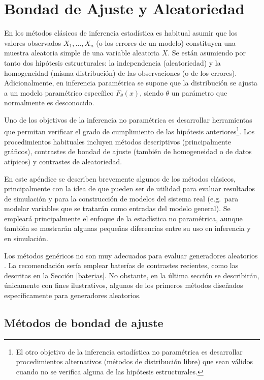 \documentclass[
  10pt,
]{book}
\theoremstyle{break}
\theoremstyle{nonumberplain}
\let\oldfootnote\footnote
\renewcommand\footnote[1]{\oldfootnote{\hspace{2mm}#1}}
\begin{document}
\hypertarget{appendix-apuxe9ndices}{%
\appendix}


\hypertarget{gof-aleat}{%
\chapter{Bondad de Ajuste y Aleatoriedad}\label{gof-aleat}}

En los métodos clásicos de inferencia estadística es habitual asumir que los valores observados \(X_1,\ldots, X_n\) (o los errores de un modelo) constituyen una muestra aleatoria simple de una variable aleatoria \(X\).
Se están asumiendo por tanto dos hipótesis estructurales: la independencia (aleatoriedad) y la homogeneidad (misma distribución) de las observaciones (o de los errores).
Adicionalmente, en inferencia paramétrica se supone que la distribución se ajusta a un modelo
paramétrico específico \(F_{\theta}(x)\), siendo \(\theta\) un parámetro que normalmente es desconocido.

Uno de los objetivos de la inferencia no paramétrica es desarrollar herramientas que permitan verificar el grado de cumplimiento de las hipótesis anteriores\footnote{
  El otro objetivo de la inferencia estadística no paramétrica es desarrollar procedimientos alternativos (métodos de distribución libre) que sean válidos cuando no se verifica alguna de las hipótesis estructurales.}.
Los procedimientos habituales incluyen métodos descriptivos (principalmente gráficos), contrastes de bondad de ajuste (también de homogeneidad o de datos atípicos) y contrastes de aleatoriedad.

En este apéndice se describen brevemente algunos de los métodos clásicos, principalmente con la idea de que pueden ser de utilidad para evaluar resultados de simulación y para la construcción de modelos del sistema real (e.g.~para modelar variables que se tratarán como entradas del modelo general). Se empleará principalmente el enfoque de la estadística no paramétrica, aunque también se mostrarán algunas pequeñas diferencias entre su uso en inferencia y en simulación.

Los métodos genéricos no son muy adecuados para evaluar generadores aleatorios \citep[e.g.][]{lecuyer07}.
La recomendación sería emplear baterías de contrastes recientes, como las descritas en la Sección \ref{baterias}.
No obstante, en la última sección se describirán, únicamente con fines ilustrativos, algunos de los primeros métodos diseñados específicamente para generadores aleatorios.

\hypertarget{gof}{%
\section{Métodos de bondad de ajuste}\label{gof}}
\end{document}
